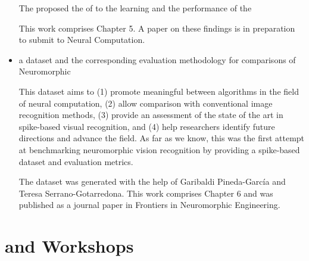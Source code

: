 \begin{itemize}
	The \protect{} proposed \protect{} \protect{} the \protect{} \protect{} of \protect{} \protect{} to \protect{} the \protect{} \protect{} learning \protect{} \protect{} and \protect{} \protect{} the \protect{} \protect{} performance of \protect{} the \protect{} \protect{}

	This work comprises Chapter 5.
	A paper on these findings is in preparation to submit to Neural Computation.
	
	\item 
	a dataset and the corresponding evaluation methodology for comparisons of Neuromorphic \protect{} \protect{}
	
	This dataset aims to (1) promote meaningful \protect{} \protect{} between algorithms in the field of neural computation, (2) allow comparison with conventional image recognition methods, (3) provide an assessment of the state of the art in spike-based visual recognition, and (4) help researchers identify future directions and advance the field.
As far as we know, this was the first attempt at benchmarking neuromorphic vision recognition by providing \protect{} a \protect{} spike-based dataset and evaluation metrics.
	
	The dataset was generated with the help of Garibaldi Pineda-Garc\'ia and Teresa Serrano-Gotarredona.
This work comprises Chapter 6 and was published as a journal paper in Frontiers in Neuromorphic Engineering.
\end{itemize}

   
\protect{}

   
\section[Papers and Workshops]{\protect{} and Workshops}
